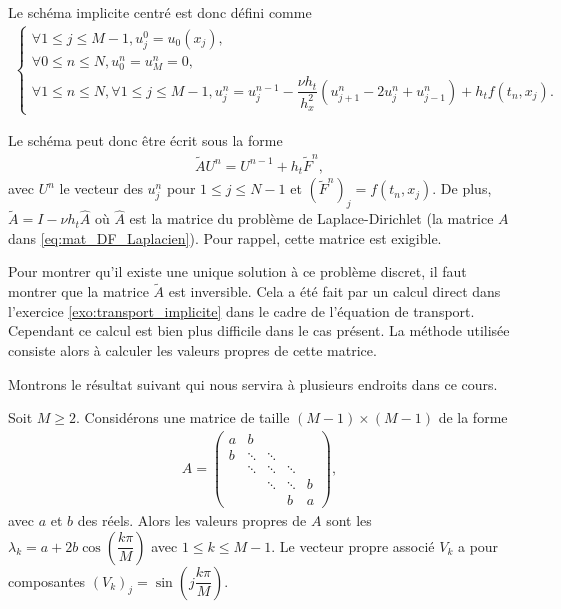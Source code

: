 \documentclass[12pt,a4paper,twoside]{article}
\begin{document}
Le sch\'ema implicite centr\'e est donc d\'efini comme
\begin{align}
  \label{eq:chaleur_DF_imp_centre}
  \left\{
  \begin{array}{l}
    \forall 1 \leq j \leq M-1 , 
    u_j^0 = u_0(x_j) ,
    \\
    \forall 0 \leq n \leq N, u_0^n = u_M^n = 0 ,
    \\
    \forall 1 \leq n \leq N, \forall 1 \leq j \leq M-1,
    u_j^{n} = u_j^{n-1} - \dfrac{\nu h_t}{h_x^2} (u_{j+1}^{n} - 2 u_{j}^{n} + u_{j-1}^{n} ) 
    + h_t f(t_n,x_j) .
  \end{array}
  \right.
\end{align}

Le sch\'ema peut donc \^etre \'ecrit sous la forme
\begin{align*}
  \widetilde{A} U^n = U^{n-1} + h_t \widetilde{F}^n ,
\end{align*}
avec $U^n$ le vecteur des $u_j^n$ pour $1 \leq j \leq N-1$ et $(\widetilde{F}^n)_j = f(t_n,x_j)$. 
De plus, $\widetilde{A} = I - \nu h_t \widehat{A}$ o\`u $\widehat{A}$ est la matrice
du probl\`eme de Laplace-Dirichlet (la matrice $A$ dans \eqref{eq:mat_DF_Laplacien}).
Pour rappel, cette matrice est exigible.


Pour montrer qu'il existe une unique solution \`a ce probl\`eme discret,
il faut montrer que la matrice $\widetilde{A}$ est inversible.
Cela a \'et\'e fait par un calcul direct dans l'exercice \ref{exo:transport_implicite}
dans le cadre de l'\'equation de transport.
Cependant ce calcul est bien plus difficile dans le cas pr\'esent.
La m\'ethode utilis\'ee consiste alors \`a calculer les valeurs propres de cette matrice.

Montrons le r\'esultat suivant qui nous servira \`a plusieurs endroits dans ce cours.
\begin{proposition}
  Soit $M \geq 2$.
  Consid\'erons une matrice de taille $(M-1) \times (M-1)$ de la forme 
  \begin{align*}
    A = 
    \begin{pmatrix}
      a & b 
      \\
      b & \ddots & \ddots
      \\
      & \ddots & \ddots & \ddots 
      \\
      &&\ddots & \ddots & b
      \\
      &&& b & a
    \end{pmatrix} ,
  \end{align*}
  avec $a$ et $b$ des r\'eels.
  Alors les valeurs propres de $A$ sont les 
  $\lambda_k = a + 2b \cos \left( \dfrac{k \pi}{M} \right)$ avec $1 \leq k \leq M-1$.
  Le vecteur propre associ\'e $V_k$ a pour composantes 
  $(V_k)_j = \sin \left( j \dfrac{k \pi}{M} \right)$.
\end{proposition}
\end{document}
